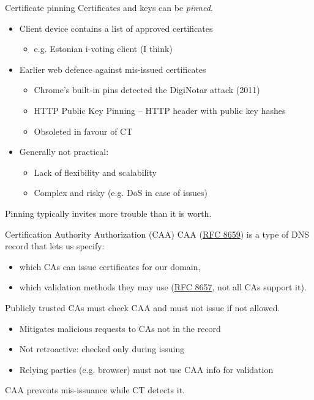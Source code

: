 \begin{frame}{Certificate pinning}
  Certificates and keys can be \emph{pinned}.
  \begin{itemize}[<+(1)->]
    \item Client device contains a list of approved certificates
    \par
    \begin{itemize}
      \item e.g. Estonian i-voting client (I think)
    \end{itemize}
    \item Earlier web defence against mis-issued certificates
    \par
    \begin{itemize}
      \item Chrome's built-in pins detected the DigiNotar attack (2011)
      \item HTTP Public Key Pinning -- HTTP header with public key hashes
      \item Obsoleted in favour of CT
    \end{itemize}
    \item Generally not practical:
    \par
    \begin{itemize}
      \item Lack of flexibility and scalability
      \item Complex and risky (e.g. DoS in case of issues)
    \end{itemize}
  \end{itemize}

  \pause
  Pinning typically invites more trouble than it is worth.
\end{frame}

\begin{frame}{Certification Authority Authorization (CAA)}
  CAA (\href{https://datatracker.ietf.org/doc/html/rfc8659}{RFC 8659}) is a type of DNS record that lets us specify:
  \begin{itemize}[<+(1)->]
    \item which CAs can issue certificates for our domain,
    \item which validation methods they may use (\href{https://datatracker.ietf.org/doc/html/rfc8657}{RFC 8657}, not all CAs support it).
  \end{itemize}

  \vspace*{0.5em}

  \pause
  Publicly trusted CAs must check CAA and must not issue if not allowed.
  \begin{itemize}[<+(1)->]
    \item Mitigates malicious requests to CAs not in the record
    \item Not retroactive: checked only during issuing
    \item Relying parties (e.g. browser) must not use CAA info for validation
  \end{itemize}

  \vspace*{0.5em}

  \pause
  CAA prevents mis-issuance while CT detects it.
\end{frame}

